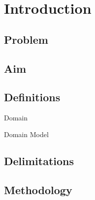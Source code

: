\chapter{Introduction}

\section{Problem}
\section{Aim}
\section{Definitions}
\begin{definition}{Domain}
	
\end{definition}

\begin{definition}{Domain Model}
	
\end{definition}

\section{Delimitations}
\section{Methodology}
